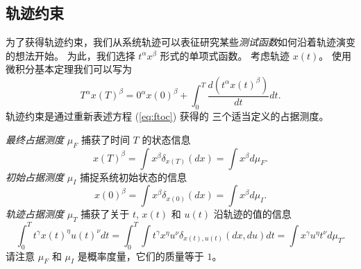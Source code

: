 \begin{translation}
\subsection{轨迹约束}
为了获得轨迹约束，我们从系统轨迹可以表征研究某些\textit{测试函数}如何沿着轨迹演变的想法开始。 为此，我们选择 $t^\alpha x^\beta$ 形式的单项式函数。 考虑轨迹 $x(t)$。 使用微积分基本定理我们可以写为
\begin{equation}\label{eq:ftoc}
T^\alpha x(T)^\beta = 0^\alpha x(0)^\beta + \int_0^T \frac{d(t^\alpha x(t)^\beta)}{dt} dt.
\end{equation}
轨迹约束是通过重新表述方程 (\ref{eq:ftoc}) 获得的
三个适当定义的占据测度。

\textit{最终占据测度} $\mu_F$ 捕获了时间 $T$ 的状态信息
\begin{equation}\nonumber
x(T)^\beta = \int x^\beta \delta_{x(T)}(dx) = \int x^\beta d\mu_F.
\end{equation}
\textit{初始占据测度} $\mu_I$ 捕捉系统初始状态的信息
\begin{equation}\nonumber
x(0)^\beta = \int x^\beta \delta_{x(0)}(dx) = \int x^\beta d\mu_I.
\end{equation}
\textit{轨迹占据测度} $\mu_T$ 捕获了关于 $t$, $x(t)$ 和 $u(t)$ 沿轨迹的值的信息
\[
\int_0^T \!\! t^\gamma x(t)^\eta u(t)^\nu dt \!
=\!\int_0^T \!\!\!\!\int t^\gamma x^\eta u^\nu \delta_{x(t),u(t)}(dx,du)dt \!
=\!\int x^\gamma u^\eta t^\nu d\mu_T.
\]
请注意 $\mu_F$ 和 $\mu_I$ 是概率度量，它们的质量等于 $1$。


\end{translation}

